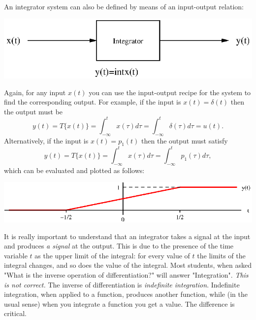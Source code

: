 \documentclass[10pt]{beamer}
\begin{document}
An integrator system can also be defined by means of an input-output relation:
\begin{center}
  \includegraphics{integratorsystem}
\end{center}
Again, for any input $x(t)$ you can use the input-output recipe for the system to find the corresponding output.  For example, if the input is $x(t) = \delta(t)$ then the output must be
\begin{equation*}
  y(t) = T\{x(t)\} = \int_{-\infty}^t x(\tau) d\tau = \int_{-\infty}^t \delta(\tau) d\tau = u(t).
\end{equation*}
Alternatively, if the input is $x(t) = p_1(t)$ then the output must satisfy
\begin{equation*}
  y(t) = T\{x(t)\} = \int_{-\infty}^t x(\tau) d\tau = \int_{-\infty}^t p_1(\tau) d\tau,
\end{equation*}
which can be evaluated and plotted as follows:
\begin{center}
  \includegraphics{intpulsesig}
\end{center}

It is really important to understand that an integrator takes a signal at the input and produces {\em a signal} at the output.  This is due to the presence of the time variable $t$ as the upper limit of the integral:  for every value of $t$ the limits of the integral changes, and so does the value of the integral.  Most students, when asked "What is the inverse operation of differentiation?" will answer "Integration".  {\em This is not correct.}  The inverse of differentiation is {\em indefinite integration}.  Indefinite integration, when applied to a function, produces another function, while (in the usual sense) when you integrate a function you get a value.  The difference is critical.
\end{document}
